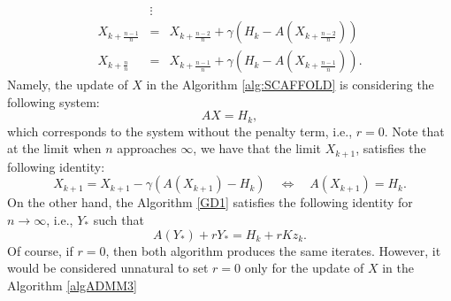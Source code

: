 \begin{itemize}
\begin{eqnarray*}
&\vdots& \\  
X_{k+\frac{n-1}{n}} &=& X_{k+\frac{n-2}{n}} + \gamma (H_k - A(X_{k+\frac{n-2}{n}})) \\ %
X_{k+\frac{n}{n}} &=& X_{k+\frac{n-1}{n}} + \gamma (H_k - A(X_{k+\frac{n-1}{n}})).
\end{eqnarray*}
Namely, the update of $X$ in the Algorithm \ref{alg:SCAFFOLD} is considering the following system: 
\begin{equation}
A X = H_k, 
\end{equation}
which corresponds to the system without the penalty term, i.e., $r=0$. Note that at the limit when $n$ approaches $\infty$, we have that the limit $X_{k+1}$, satisfies the following identity: 
\begin{equation} 
X_{k+1} = X_{k+1} - \gamma (A(X_{k+1}) - H_k) \quad \Leftrightarrow \quad A(X_{k+1}) = H_k.  
\end{equation}
On the other hand, the Algorithm \ref{GD1} satisfies the following identity for $n \rightarrow \infty$, i.e., $Y_*$ such that
\begin{equation} 
A(Y_*) + r Y_* = H_k + rKz_k. 
\end{equation}
Of course, if $r = 0$, then both algorithm produces the same iterates. However, it would be considered unnatural to set $r = 0$ only for the update of $X$ in the Algorithm \ref{algADMM3}


\end{itemize}
